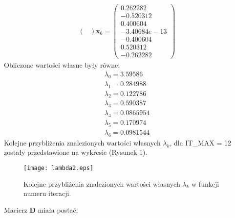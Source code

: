\documentclass{article}
\begin{document}
\begin{equation}
\begin{array}{c}
\begin{pmatrix}
	\end{pmatrix}
	\textbf{x}_6 = 
	\begin{pmatrix}
	0.262282\\-0.520312\\0.400604\\-3.40684e-13\\-0.400604\\0.520312\\-0.262282
	\end{pmatrix}	
\end{array}
\end{equation}
Obliczone wartości własne były równe:
\begin{equation}
	\begin{array}{l}
	\lambda_0 = 3.59586 \\ 
	\lambda_1 = 0.284988\\ 
	\lambda_2 = 0.122786\\ 
	\lambda_3  = 0.590387\\ 
	\lambda_4 = 0.0865954 \\ 
	\lambda_5 = 0.170974\\ 
	\lambda_6 = 0.0981544
	\end{array}
\end{equation}
Kolejne przybliżenia znalezionych wartości własnych $\lambda_k$, dla IT\_MAX = 12 zostały przedstawione na wykresie (Rysunek 1).

\begin{figure}[h]
\texttt{[image: lambda2.eps]}
\centering
\caption{Kolejne przybliżenia znalezionych wartości własnych $\lambda_k$ w funkcji numeru iteracji.}
\end{figure}
\newpage
Macierz $\textbf{D}$ miała postać:
\end{document}
